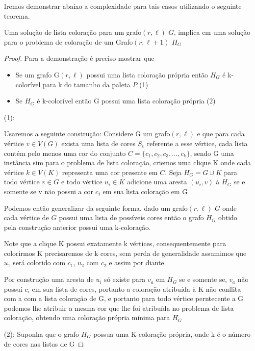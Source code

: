 Iremos demonstrar abaixo a complexidade para tais casos utilizando o seguinte teorema. 
\begin{teorema}
	Uma solução de lista coloração para um grafo$(r,\ell)$ $G$, implica em uma solução para o problema de coloração de um Grafo$(r,\ell+1)$ $H_G$
\end{teorema}
\begin{proof}
	Para a demonstração é preciso mostrar que
	\begin{itemize}
		\item Se um grafo G$(r,\ell)$ possui uma lista coloração própria então $H_G$ é k-colorível para k do tamanho da paleta $P$ (1)
		\item Se $H_G$ é k-colorível então G possui uma lista coloração própria (2)
	\end{itemize}
	(1):\newline
	
	Usaremos a seguinte construção:\newline
	Considere G um grafo$(r,\ell)$ e que para cada vértice $v \in V(G)$ exista uma lista de cores $S_v$ referente a esse vértice, cada lista contém pelo menos uma cor do conjunto $C = \{c_1,c_2,c_3,...,c_k \}$, sendo G uma instância sim para o problema de lista coloração, criemos uma clique K onde cada vértice $k \in V(K)$ representa uma cor presente em $C$. Seja $H_G = G \cup K$ para todo vértice $v \in G$ e todo vértice $u_i \in K$ adicione uma aresta $(u_i,v)$ à $H_G$ se e somente se v não possui a cor $c_i$ em sua lista coloração em G
	
	Podemos então generalizar da seguinte forma, dado um grafo$(r,\ell)$ $G$ onde cada vértice de $G$ possui uma lista de possíveis cores então o grafo $H_G$ obtido pela construção anterior possui uma k-coloração.
	
	Note que a clique K possui exatamente k vértices, consequentemente para colorirmos K precisaremos de k cores, sem perda de generalidade assumimos que $u_1$ será colorido com $c_1$, $u_2$ com $c_2$ e assim por diante.
	
	Por construção uma aresta de $u_i$ só existe para $v_a$ em $H_G$ se e somente se, $v_a$ não possui $c_i$ em sua lista de cores, portanto a coloração atribuída à K não conflita com a com a lista coloração de G, e portanto para todo vértice perntecente a G podemos lhe atribuir a mesma cor que lhe foi atribuída no problema de lista coloração, obtendo uma coloração própria mínima para $H_G$
	
	(2):\newline
	Suponha que o grafo $H_G$ possua uma K-coloração própria, onde k é o número de cores nas listas de G
	

\end{proof}

